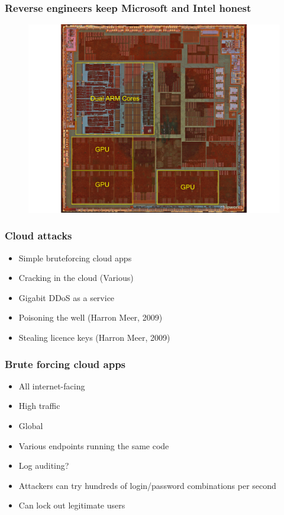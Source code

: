 \documentclass{beamer}
\begin{document}
\begin{frame}
    \frametitle{Reverse engineers keep Microsoft and Intel honest}
    \begin{figure}
        \includegraphics[width=\textwidth]{../img/iphone5_a6.jpg}
        \label{fig:cloudoverview}
    \end{figure}
\end{frame}

\begin{frame}
    \frametitle{Cloud attacks}
    \begin{itemize}
      \item Simple bruteforcing cloud apps
      \item Cracking in the cloud (Various) %
      \item Gigabit DDoS as a service %
      \item Poisoning the well (Harron Meer, 2009)
      \item Stealing licence keys (Harron Meer, 2009)
    \end{itemize}
\end{frame}

\begin{frame}
    \frametitle{Brute forcing cloud apps}
    \begin{itemize}
    \item All internet-facing
    \item High traffic
    \item Global
    \item Various endpoints running the same code
    \item Log auditing?
    \item Attackers can try hundreds of login/password combinations per second
    \item Can lock out legitimate users
    \end{itemize}
\end{frame}
\end{document}
